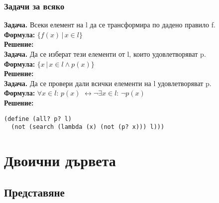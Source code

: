 \documentclass[alsotrans,beameroptions={aspectratio=169}]{beamerswitch}
\begin{document}
\begin{frame}[fragile]
  \frametitle{Задачи за всяко}
  \textbf{Задача.} Всеки елемент на l да се трансформира по дадено правило f.\\
  \pause
  \textbf{Формула:} $\{f(x)\,|\,x \in l \}$\\
  \pause
  \textbf{Решение:} \\[2ex]
  \pause
  \textbf{Задача.} Да се изберат тези елементи от l, които удовлетворяват p.\\
  \pause
  \textbf{Формула:} $\{x\,|\,x \in l \wedge p(x) \}$\\
  \pause
  \textbf{Решение:} \\[2ex]
  \pause
  \textbf{Задача.} Да се провери дали всички елементи на l удовлетворяват p.\\
  \pause
  \textbf{Формула:} $\forall x\in l:\,p(x)$ \pause $\leftrightarrow \neg \exists x\in l:\,\neg p(x)$\\
  \pause
  \textbf{Решение:}
\begin{lstlisting}
(define (all? p? l)
  (not (search (lambda (x) (not (p? x))) l)))
\end{lstlisting}
\end{frame}
\section{Двоични дървета}

\subsection{Представяне}
\end{document}
